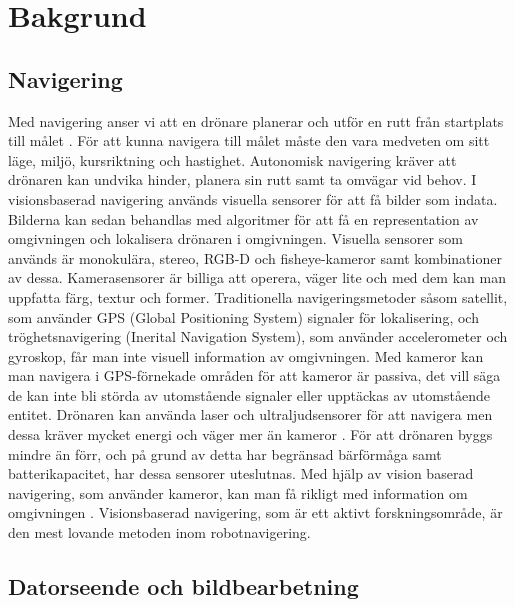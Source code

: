\chapter{Bakgrund}

\section{Navigering}

Med navigering anser vi att en drönare planerar och utför en rutt från startplats till målet \citep{geospatial}. För att kunna navigera till målet måste den vara medveten om sitt läge, miljö, kursriktning och hastighet. Autonomisk navigering kräver att drönaren kan undvika hinder, planera sin rutt samt ta omvägar vid behov. I visionsbaserad navigering används visuella sensorer för att få bilder som indata. Bilderna kan sedan behandlas med algoritmer för att få en representation av omgivningen och lokalisera drönaren i omgivningen. Visuella sensorer som används är monokulära, stereo, RGB-D och fisheye-kameror samt kombinationer av dessa. Kamerasensorer är billiga att operera, väger lite och med dem kan man uppfatta färg, textur och former. Traditionella navigeringsmetoder såsom satellit, som använder GPS (Global Positioning System) signaler för lokalisering, och tröghetsnavigering (Inerital Navigation System), som använder accelerometer och gyroskop, får man inte visuell information av omgivningen. Med kameror kan man navigera i GPS-förnekade områden för att kameror är passiva, det vill säga de kan inte bli störda av utomstående signaler eller upptäckas av utomstående entitet. Drönaren kan använda laser och ultraljudsensorer för att navigera men dessa kräver mycket energi och väger mer än kameror \citep{6385934}. För att drönaren byggs mindre än förr, och på grund av detta har begränsad bärförmåga samt batterikapacitet, har dessa sensorer uteslutnas. Med hjälp av vision baserad navigering, som använder kameror, kan man få rikligt med information om omgivningen \citep{geospatial}. Visionsbaserad navigering, som är ett aktivt forskningsområde, är den mest lovande metoden inom robotnavigering.

\section{Datorseende och bildbearbetning}


